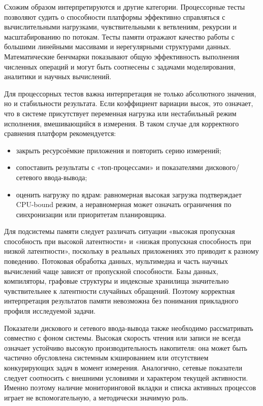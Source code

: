 Схожим образом интерпретируются и другие категории. Процессорные тесты позволяют судить о способности платформы эффективно справляться с вычислительными нагрузками, чувствительными к ветвлениям, рекурсии и масштабированию по потокам. Тесты памяти отражают качество работы с большими линейными массивами и нерегулярными структурами данных. Математические бенчмарки показывают общую эффективность выполнения численных операций и могут быть соотнесены с задачами моделирования, аналитики и научных вычислений.

Для процессорных тестов важна интерпретация не только абсолютного значения, но и стабильности результата. Если коэффициент вариации высок, это означает, что в системе присутствует переменная нагрузка или нестабильный режим исполнения, вмешивающийся в измерения. В таком случае для корректного сравнения платформ рекомендуется:
\begin{itemize}
    \item закрыть ресурсоёмкие приложения и повторить серию измерений;
    \item сопоставить результаты с «топ-процессами» и показателями дискового/сетевого ввода-вывода;
    \item оценить нагрузку по ядрам: равномерная высокая загрузка подтверждает CPU-bound режим, а неравномерная может означать ограничения по синхронизации или приоритетам планировщика.
\end{itemize}

Для подсистемы памяти следует различать ситуации «высокая пропускная способность при высокой латентности» и «низкая пропускная способность при низкой латентности», поскольку в реальных приложениях это приводит к разному поведению. Потоковая обработка данных, мультимедиа и часть научных вычислений чаще зависят от пропускной способности. Базы данных, компиляторы, графовые структуры и индексные хранилища значительно чувствительнее к латентности случайных обращений. Поэтому корректная интерпретация результатов памяти невозможна без понимания прикладного профиля исследуемой задачи.

Показатели дискового и сетевого ввода-вывода также необходимо рассматривать совместно с фоном системы. Высокая скорость чтения или записи не всегда означает устойчиво высокую производительность накопителя: она может быть частично обусловлена системным кэшированием или отсутствием конкурирующих задач в момент измерения. Аналогично, сетевые показатели следует соотносить с внешними условиями и характером текущей активности. Именно поэтому наличие мониторинговой вкладки и списка активных процессов играет не вспомогательную, а методически значимую роль.

